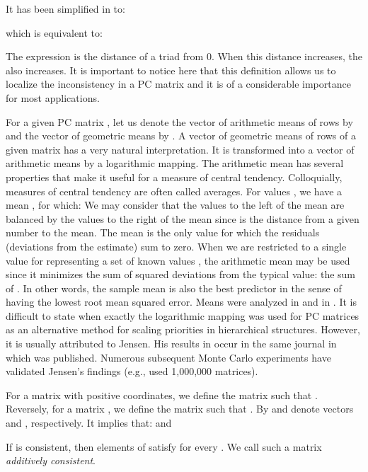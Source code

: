 \documentclass [12pt]{article}
\theoremstyle{definition}
\begin{document}
\noindent It has been simplified in \cite{KS2014a} to:

 

\noindent which is equivalent to:



\noindent The expression 
is the distance of a triad  from 0. When this distance increases, the  also increases. It is important to notice here that this definition allows us to localize the inconsistency in a PC matrix and it is of a considerable importance for most applications.  






For a given PC matrix , let us denote the vector of arithmetic means of rows by  and the vector of geometric means by . 
A vector of geometric means of rows of a given matrix  has a very natural interpretation.
It is transformed into a vector of arithmetic means by a logarithmic mapping.
The arithmetic mean has several properties that make it useful for a measure of central tendency.
Colloquially, measures of central tendency are often called averages.
For values , 
we have a mean , for which: 
We may consider that the values to the left of the mean are balanced by the values to the right of the mean since 
 is the distance from a given number to the mean. The mean is the only value for which the residuals 
(deviations from the estimate) sum to zero.
When we are restricted to a single value for representing a set of known values , 
the arithmetic mean may be used since it minimizes the sum of squared deviations 
from the typical value: the sum of . 
In other words, the sample mean is also the best predictor
in the sense of having the lowest root mean squared error. Means were analyzed in \cite{Aczel1948} and in \cite{AczelSaaty1983}. 
It is difficult to state when exactly the logarithmic mapping was used for PC matrices as an alternative method for scaling priorities in hierarchical structures. However, it is usually attributed to Jensen. His results in \cite{Jensen84} occur in the same journal in which \cite{Saaty77} was published. Numerous subsequent Monte Carlo experiments have validated Jensen's findings (e.g., \cite{HK1996} used 1,000,000 matrices). 

For a matrix  with positive coordinates, we define the matrix  such that . 
Reversely, for a matrix , we define the matrix  such that . 
By  and  denote vectors  
and , respectively. It implies that:
  and 


\noindent If  is consistent, then elements of  satisfy 
 for every . We call such a matrix {\em additively consistent}.
\end{document}
